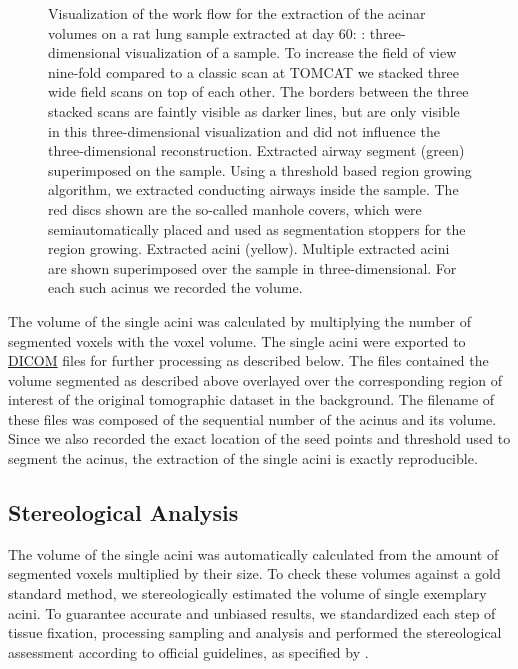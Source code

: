 \documentclass[%
	twoside,
	paper=a4,%
	abstract=true,%
	]{scrartcl}
\newlength\imagescale		%
\begin{document}
\begin{figure}
{%
		\label{subfig:extracted acini}%
		}
	\caption{Visualization of the work flow for the extraction of the acinar volumes on a rat lung sample extracted at day 60: %
		\protect{}: three-dimensional visualization of a sample. To increase the field of view nine-fold compared to a classic scan at TOMCAT we stacked three wide field scans on top of each other. The borders between the three stacked scans are faintly visible as darker lines, but are only visible in this three-dimensional visualization and did not influence the three-dimensional reconstruction. %
		\protect{} Extracted airway segment (green) superimposed on the sample. Using a threshold based region growing algorithm, we extracted conducting airways inside the sample. The red discs shown are the so-called manhole covers, which were semiautomatically placed and used as segmentation stoppers for the region growing. %
		\protect{} Extracted acini (yellow). Multiple extracted acini are shown superimposed over the sample in three-dimensional. For each such acinus we recorded the volume.%
		}
	\label{fig:workflow}
\end{figure}

The volume of the single acini was calculated by multiplying the number of segmented voxels with the voxel volume. The single acini were exported to \href{https://secure.wikimedia.org/wikipedia/en/w/index.php?title=Digital_Imaging_and_Communications_in_Medicine&oldid=415023605}{DICOM} files for further processing as described below. The files contained the volume segmented as described above overlayed over the corresponding region of interest of the original tomographic dataset in the background. The filename of these files was composed of the sequential number of the acinus and its volume. Since we also recorded the exact location of the seed points and threshold used to segment the acinus, the extraction of the single acini is exactly reproducible.

\subsection{Stereological Analysis}
The volume of the single acini was automatically calculated from the amount of segmented voxels multiplied by their size. To check these volumes against a gold standard method, we stereologically estimated the volume of single exemplary acini. To guarantee accurate and unbiased results, we standardized each step of tissue fixation, processing sampling and analysis and performed the stereological assessment according to official guidelines, as specified by \citet{Hsia2010}.
\end{document}
